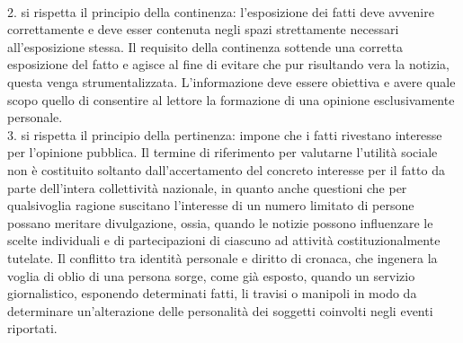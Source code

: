 \\2. si rispetta il principio della continenza: l'esposizione dei fatti deve avvenire correttamente e deve esser contenuta negli spazi strettamente necessari all'esposizione stessa. Il requisito della continenza sottende una corretta esposizione del fatto e agisce al fine di evitare che pur risultando vera la notizia, questa venga strumentalizzata.
L'informazione deve essere obiettiva e avere quale scopo quello di consentire al lettore la formazione di una opinione esclusivamente personale.
\\3. si rispetta il principio della pertinenza: impone che i fatti rivestano interesse per l'opinione pubblica. Il termine di riferimento per valutarne l'utilità sociale non è costituito soltanto dall'accertamento del concreto interesse per il fatto da parte dell'intera collettività nazionale, in quanto anche questioni che per qualsivoglia ragione suscitano l'interesse di un numero limitato di persone possano meritare divulgazione, ossia, quando le notizie possono influenzare le scelte individuali e di partecipazioni di ciascuno ad attività costituzionalmente tutelate. %
Il conflitto tra identità personale e diritto di cronaca, che ingenera la voglia di oblio di una persona sorge, come già esposto, quando un servizio giornalistico, esponendo determinati fatti, li travisi o manipoli in modo da determinare un'alterazione delle personalità dei soggetti coinvolti negli eventi riportati. %
